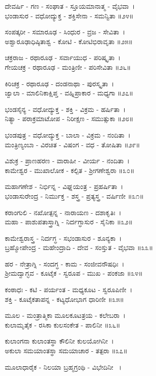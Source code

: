 ದೇವರ್ಷಿ - ಗಣ - ಸಂಘಾತ - ಸ್ತೂಯಮಾನಾತ್ಮ - ವೈಭವಾ~।\\
ಭಂಡಾಸುರ - ವಧೋದ್ಯುಕ್ತ - ಶಕ್ತಿಸೇನಾ - ಸಮನ್ವಿತಾ ॥೨೪॥

ಸಂಪತ್ಕರೀ - ಸಮಾರೂಢ - ಸಿಂಧುರ - ವ್ರಜ - ಸೇವಿತಾ~।\\
ಅಶ್ವಾರೂಢಾಧಿಷ್ಠಿತಾಶ್ವ - ಕೋಟಿ - ಕೋಟಿಭಿರಾವೃತಾ ॥೨೫॥

ಚಕ್ರರಾಜ - ರಥಾರೂಢ - ಸರ್ವಾಯುಧ - ಪರಿಷ್ಕೃತಾ~।\\
ಗೇಯಚಕ್ರ - ರಥಾರೂಢ - ಮಂತ್ರಿಣೀ - ಪರಿಸೇವಿತಾ ॥೨೬॥

ಕಿರಿಚಕ್ರ - ರಥಾರೂಢ - ದಂಡನಾಥಾ - ಪುರಸ್ಕೃತಾ~।\\
ಜ್ವಾಲಾ - ಮಾಲಿನಿಕಾಕ್ಷಿಪ್ತ - ವಹ್ನಿಪ್ರಾಕಾರ - ಮಧ್ಯಗಾ ॥೨೭॥

ಭಂಡಸೈನ್ಯ - ವಧೋದ್ಯುಕ್ತ - ಶಕ್ತಿ - ವಿಕ್ರಮ - ಹರ್ಷಿತಾ~।\\
ನಿತ್ಯಾ - ಪರಾಕ್ರಮಾಟೋಪ - ನಿರೀಕ್ಷಣ - ಸಮುತ್ಸುಕಾ ॥೨೮॥

ಭಂಡಪುತ್ರ - ವಧೋದ್ಯುಕ್ತ - ಬಾಲಾ - ವಿಕ್ರಮ - ನಂದಿತಾ~।\\
ಮಂತ್ರಿಣ್ಯಂಬಾ - ವಿರಚಿತ - ವಿಷಂಗ - ವಧ - ತೋಷಿತಾ ॥೨೯॥

ವಿಶುಕ್ರ - ಪ್ರಾಣಹರಣ - ವಾರಾಹೀ - ವೀರ್ಯ - ನಂದಿತಾ~।\\
ಕಾಮೇಶ್ವರ - ಮುಖಾಲೋಕ - ಕಲ್ಪಿತ - ಶ್ರೀಗಣೇಶ್ವರಾ ॥೩೦॥

ಮಹಾಗಣೇಶ - ನಿರ್ಭಿನ್ನ - ವಿಘ್ನಯಂತ್ರ - ಪ್ರಹರ್ಷಿತಾ~।\\
ಭಂಡಾಸುರೇಂದ್ರ - ನಿರ್ಮುಕ್ತ - ಶಸ್ತ್ರ - ಪ್ರತ್ಯಸ್ತ್ರ - ವರ್ಷಿಣೀ ॥೩೧॥

ಕರಾಂಗುಲಿ - ನಖೋತ್ಪನ್ನ - ನಾರಾಯಣ - ದಶಾಕೃತಿಃ~।\\
ಮಹಾ - ಪಾಶುಪತಾಸ್ತ್ರಾಗ್ನಿ - ನಿರ್ದಗ್ಧಾಸುರ - ಸೈನಿಕಾ ॥೩೨॥

ಕಾಮೇಶ್ವರಾಸ್ತ್ರ - ನಿರ್ದಗ್ಧ - ಸಭಂಡಾಸುರ - ಶೂನ್ಯಕಾ~।\\
ಬ್ರಹ್ಮೋಪೇಂದ್ರ - ಮಹೇಂದ್ರಾದಿ - ದೇವ - ಸಂಸ್ತುತ - ವೈಭವಾ ॥೩೩॥

ಹರ - ನೇತ್ರಾಗ್ನಿ - ಸಂದಗ್ಧ - ಕಾಮ - ಸಂಜೀವನೌಷಧಿಃ~।\\
ಶ್ರೀಮದ್ವಾಗ್ಭವ - ಕೂಟೈಕ - ಸ್ವರೂಪ - ಮುಖ - ಪಂಕಜಾ ॥೩೪॥

ಕಂಠಾಧಃ - ಕಟಿ - ಪರ್ಯಂತ - ಮಧ್ಯಕೂಟ - ಸ್ವರೂಪಿಣೀ~।\\
ಶಕ್ತಿ - ಕೂಟೈಕತಾಪನ್ನ - ಕಟ್ಯಧೋಭಾಗ ಧಾರಿಣೀ ॥೩೫॥

ಮೂಲ - ಮಂತ್ರಾತ್ಮಿಕಾ ಮೂಲಕೂಟತ್ರಯ - ಕಲೇಬರಾ~।\\
ಕುಲಾಮೃತೈಕ - ರಸಿಕಾ ಕುಲಸಂಕೇತ - ಪಾಲಿನೀ ॥೩೬॥

ಕುಲಾಂಗನಾ ಕುಲಾಂತಸ್ಥಾ ಕೌಲಿನೀ ಕುಲಯೋಗಿನೀ~।\\
ಅಕುಲಾ ಸಮಯಾಂತಸ್ಥಾ ಸಮಯಾಚಾರ - ತತ್ಪರಾ ॥೩೭॥

ಮೂಲಾಧಾರೈಕ - ನಿಲಯಾ ಬ್ರಹ್ಮಗ್ರಂಥಿ - ವಿಭೇದಿನೀ ~।

